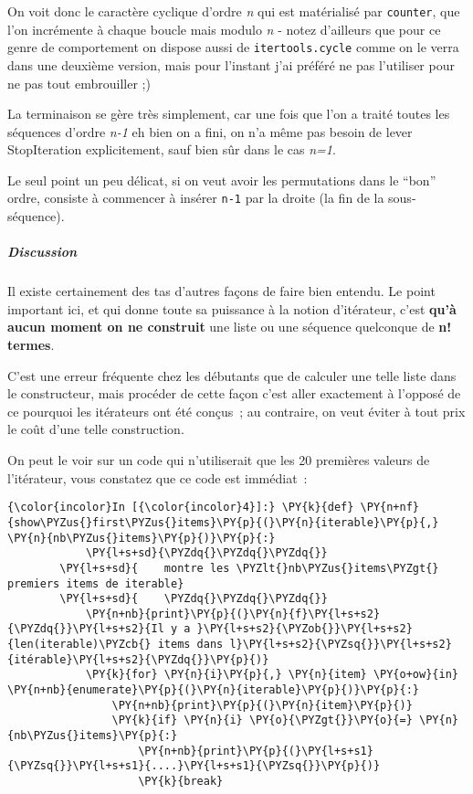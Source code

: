     On voit donc le caractère cyclique d'ordre \emph{n} qui est matérialisé
par \texttt{counter}, que l'on incrémente à chaque boucle mais modulo
\emph{n} - notez d'ailleurs que pour ce genre de comportement on dispose
aussi de \texttt{itertools.cycle} comme on le verra dans une deuxième
version, mais pour l'instant j'ai préféré ne pas l'utiliser pour ne pas
tout embrouiller ;)

La terminaison se gère très simplement, car une fois que l'on a traité
toutes les séquences d'ordre \emph{n-1} eh bien on a fini, on n'a même
pas besoin de lever StopIteration explicitement, sauf bien sûr dans le
cas \emph{n=1}.

Le seul point un peu délicat, si on veut avoir les permutations dans le
``bon'' ordre, consiste à commencer à insérer \texttt{n-1} par la droite
(la fin de la sous-séquence).

    \hypertarget{discussion}{%
\subparagraph{Discussion}\label{discussion}}

    Il existe certainement des tas d'autres façons de faire bien entendu. Le
point important ici, et qui donne toute sa puissance à la notion
d'itérateur, c'est \textbf{qu'à aucun moment on ne construit} une liste
ou une séquence quelconque de \textbf{n! termes}.

C'est une erreur fréquente chez les débutants que de calculer une telle
liste dans le constructeur, mais procéder de cette façon c'est aller
exactement à l'opposé de ce pourquoi les itérateurs ont été conçus~; au
contraire, on veut éviter à tout prix le coût d'une telle construction.

On peut le voir sur un code qui n'utiliserait que les 20 premières
valeurs de l'itérateur, vous constatez que ce code est immédiat~:

    \begin{Verbatim}[commandchars=\\\{\},frame=single,framerule=0.3mm,rulecolor=\color{cellframecolor}]
{\color{incolor}In [{\color{incolor}4}]:} \PY{k}{def} \PY{n+nf}{show\PYZus{}first\PYZus{}items}\PY{p}{(}\PY{n}{iterable}\PY{p}{,} \PY{n}{nb\PYZus{}items}\PY{p}{)}\PY{p}{:}
            \PY{l+s+sd}{\PYZdq{}\PYZdq{}\PYZdq{}}
        \PY{l+s+sd}{    montre les \PYZlt{}nb\PYZus{}items\PYZgt{} premiers items de iterable}
        \PY{l+s+sd}{    \PYZdq{}\PYZdq{}\PYZdq{}}
            \PY{n+nb}{print}\PY{p}{(}\PY{n}{f}\PY{l+s+s2}{\PYZdq{}}\PY{l+s+s2}{Il y a }\PY{l+s+s2}{\PYZob{}}\PY{l+s+s2}{len(iterable)\PYZcb{} items dans l}\PY{l+s+s2}{\PYZsq{}}\PY{l+s+s2}{itérable}\PY{l+s+s2}{\PYZdq{}}\PY{p}{)}
            \PY{k}{for} \PY{n}{i}\PY{p}{,} \PY{n}{item} \PY{o+ow}{in} \PY{n+nb}{enumerate}\PY{p}{(}\PY{n}{iterable}\PY{p}{)}\PY{p}{:}
                \PY{n+nb}{print}\PY{p}{(}\PY{n}{item}\PY{p}{)}
                \PY{k}{if} \PY{n}{i} \PY{o}{\PYZgt{}}\PY{o}{=} \PY{n}{nb\PYZus{}items}\PY{p}{:}
                    \PY{n+nb}{print}\PY{p}{(}\PY{l+s+s1}{\PYZsq{}}\PY{l+s+s1}{....}\PY{l+s+s1}{\PYZsq{}}\PY{p}{)}
                    \PY{k}{break}
\end{Verbatim}



